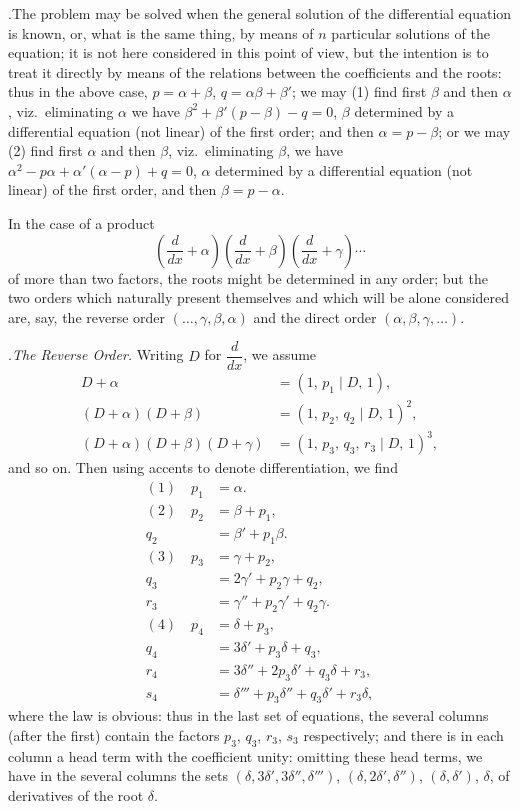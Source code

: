 \documentclass[11pt]{article}
\begin{document}
\medskip

.\quad The problem may be solved when the general solution of the differential equation is known, or, what is the same thing, by means of $n$ particular solutions of the equation; it is not here considered in this point of view, but the intention is to treat it directly by means of the relations between the coefficients and the roots: thus in the above case, $p = \alpha+\beta$, $q = \alpha\beta+\beta'$; we may (1) find first $\beta$ and then $\alpha$, viz.\ eliminating $\alpha$ we have $\beta^2 + \beta'(p-\beta) - q = 0$, $\beta$ determined by a differential equation (not linear) of the first order; and then $\alpha = p-\beta$; or we may (2) find first $\alpha$ and then $\beta$, viz.\ eliminating $\beta$, we have $\alpha^2 - p\alpha + \alpha'(\alpha - p) + q = 0$, $\alpha$ determined by a differential equation (not linear) of the first order, and then $\beta = p-\alpha$.

In the case of a product
\[
\left(\frac{d}{dx} + \alpha\right)\!\left(\frac{d}{dx} + \beta\right)\!\left(\frac{d}{dx} + \gamma\right)\!\dotsb
\]
of more than two factors, the roots might be determined in any order; but the two orders which naturally present themselves and which will be alone considered are, say, the reverse order $(\dotsc,\gamma,\beta,\alpha)$ and the direct order $(\alpha,\beta,\gamma,\dotsc)$.

\medskip

.\quad \emph{The Reverse Order.} Writing $D$ for $\dfrac{d}{dx}$, we assume
\begin{align*}
D + \alpha &= (1,\,p_1\mid D,\,1),\\
(D + \alpha)(D + \beta) &= (1,\,p_2,\,q_2\mid D,\,1)^2,\\
(D + \alpha)(D + \beta)(D + \gamma) &= (1,\,p_3,\,q_3,\,r_3\mid D,\,1)^3,
\end{align*}
and so on. Then using accents to denote differentiation, we find
\begin{align*}
(1)\quad p_1 &= \alpha.\\
(2)\quad p_2 &= \beta + p_1,\\
q_2 &= \beta' + p_1\beta.\\
(3)\quad p_3 &= \gamma + p_2,\\
q_3 &= 2\gamma' + p_2\gamma + q_2,\\
r_3 &= \gamma'' + p_2\gamma' + q_2\gamma.\\
(4)\quad p_4 &= \delta + p_3,\\
q_4 &= 3\delta' + p_3\delta + q_3,\\
r_4 &= 3\delta'' + 2p_3\delta' + q_3\delta + r_3,\\
s_4 &= \delta''' + p_3\delta'' + q_3\delta' + r_3\delta,
\end{align*}
where the law is obvious: thus in the last set of equations, the several columns (after the first) contain the factors $p_3$, $q_3$, $r_3$, $s_3$ respectively; and there is in each column a head term with the coefficient unity: omitting these head terms, we have in the several columns the sets $(\delta,3\delta',3\delta'',\delta''')$, $(\delta,2\delta',\delta'')$, $(\delta,\delta')$, $\delta$, of derivatives of the root $\delta$.
\end{document}
